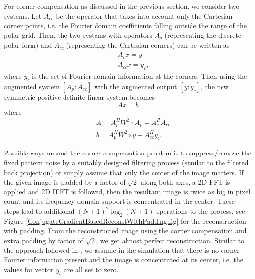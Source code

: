 \documentclass{UCF_ETD}
\begin{document}
 
 For corner compensation as discussed in the previous section, we consider two systems. Let $A_{cc}$ be the operator that takes into account only the Cartesian corner points, i.e. the Fourier domain coefficients falling outside the range of the polar grid. Then, the two systems with operators $A_p$ (representing the discrete polar form) and $A_{cc}$ (representing the Cartesian corners) can be written as
 \begin{eqnarray}\label{ConjugateGradBasedInversionSysI_II}
 && A_p x = y \\
 && A_{cc}x = y_c,
 \end{eqnarray}
 where $y_c$ is the set of Fourier domain information at the corners. Then using the augmented system $[A_p: A_{cc}]$ with the augmented output $[y:y_c]$, the new symmetric positive definite linear system becomes
 \begin{equation}\label{ConjugateGradBasedInversion}
 Ax = b
 \end{equation}
 where
 \begin{eqnarray*}
 && A = A^H_p W^2 \circ A_p + A^H_{cc}A_{cc} \\
 && b = A^H_pW^2 \circ y + A^H_{cc}y_c.
 \end{eqnarray*}
 
  Possible ways around the corner compensation problem is to suppress/remove the fixed pattern noise by a suitably designed filtering process (similar to the filtered back projection) or
   simply assume that only the center of the image matters.
   If the given image is padded by a factor of $\sqrt{2}$ along both axes, a 2D FFT is applied and  2D IFFT is followed, then the resultant image is twice as big in pixel count and its frequency domain support is concentrated in the center. These steps lead to additional $(N+1)^2\log_2(N+1)$ operations to the process, see Figure \ref{ConjugateGradientBasedReconstWithPadding.fig} for the reconstruction with padding. From the reconstructed image using the corner compensation and extra padding by factor of $\sqrt{2}$, we get almost perfect reconstruction. Similar to the approach followed in \cite{Amir2006}, we assume in the simulation that there is no corner Fourier information present and the image is concentrated at its center, i.e. the values for vector $y_c$ are all set to zero.
 
\end{document}
